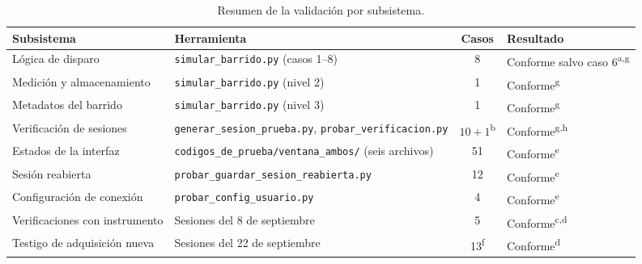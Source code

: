 \begin{table}[H]
  \centering
  \caption{Resumen de la validación por subsistema.}
  \label{tab:resumen_validacion}
  \small
  \begin{tabularx}{\textwidth}{>{\raggedright\arraybackslash}p{3.6cm}
                               >{\raggedright\arraybackslash}X c
                               >{\raggedright\arraybackslash}p{2.1cm}}
    \toprule
    \textbf{Subsistema} & \textbf{Herramienta} & \textbf{Casos} &
    \textbf{Resultado} \\
    \midrule
    Lógica de disparo & \texttt{simular\_\allowbreak{}barrido.py} (casos 1--8) & 8 &
      Conforme salvo caso 6\textsuperscript{a,g} \\
    Medición y almacenamiento & \texttt{simular\_\allowbreak{}barrido.py} (nivel 2) & 1 &
      Conforme\textsuperscript{g} \\
    Metadatos del barrido & \texttt{simular\_\allowbreak{}barrido.py} (nivel 3) & 1 &
      Conforme\textsuperscript{g} \\
    Verificación de sesiones & \texttt{generar\_\allowbreak{}sesion\_\allowbreak{}prueba.py},
      \texttt{probar\_\allowbreak{}verificacion.py} &
      $10+1$\textsuperscript{b} & Conforme\textsuperscript{g,h} \\
    Estados de la interfaz & \texttt{codigos\_\allowbreak{}de\_\allowbreak{}prueba/\allowbreak{}ventana\_\allowbreak{}ambos/\allowbreak{}}
      (seis archivos) & 51 & Conforme\textsuperscript{e} \\
    Sesión reabierta & \texttt{probar\_\allowbreak{}guardar\_\allowbreak{}sesion\_\allowbreak{}reabierta.py} & 12 &
      Conforme\textsuperscript{e} \\
    Configuración de conexión & \texttt{probar\_\allowbreak{}config\_\allowbreak{}usuario.py} & 4 &
      Conforme\textsuperscript{e} \\
    Verificaciones con instrumento & Sesiones del 8 de septiembre & 5 &
      Conforme\textsuperscript{c,d} \\
    Testigo de adquisición nueva & Sesiones del 22 de septiembre &
      13\textsuperscript{f} & Conforme\textsuperscript{d} \\
    \bottomrule
  \end{tabularx}


\end{table}
